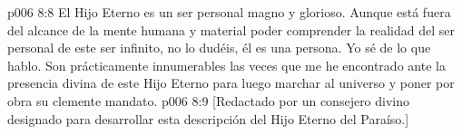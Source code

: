 \vs p006 8:8 \pc El Hijo Eterno es un ser personal magno y glorioso. Aunque está fuera del alcance de la mente humana y material poder comprender la realidad del ser personal de este ser infinito, no lo dudéis, él es una persona. Yo sé de lo que hablo. Son prácticamente innumerables las veces que me he encontrado ante la presencia divina de este Hijo Eterno para luego marchar al universo y poner por obra su clemente mandato.
\vsetoff
\vs p006 8:9 [Redactado por un consejero divino designado para desarrollar esta descripción del Hijo Eterno del Paraíso.]
